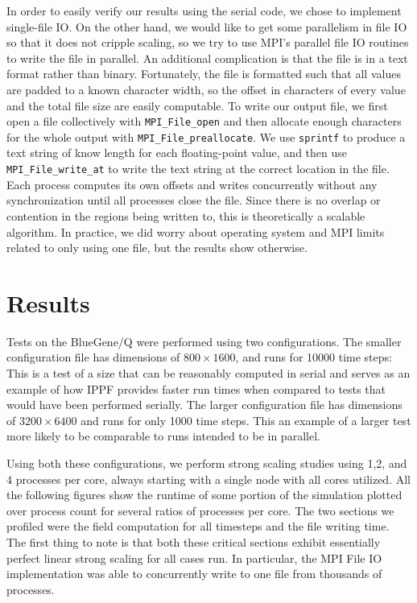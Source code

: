\documentclass[twocolumn]{article}
\begin{document}
In order to easily verify our results using the serial code,
we chose to implement single-file IO.
On the other hand, we would like to get some parallelism in
file IO so that it does not cripple scaling, so we try to use
MPI's parallel file IO routines to write the file in parallel.
An additional complication is that the file is in a text format
rather than binary.
Fortunately, the file is formatted such that all values are
padded to a known character width, so the offset in characters
of every value and the total file size are easily computable.
To write our output file, we first open a file collectively
with \texttt{MPI\_File\_open} and then 
allocate enough characters for the whole output with
\texttt{MPI\_File\_preallocate}.
We use
\texttt{sprintf} to produce a text string of know length for
each floating-point value, and then use
\texttt{MPI\_File\_write\_at} to write the text string at
the correct location in the file.
Each process computes its own offsets and writes concurrently
without any synchronization until all processes close the file.
Since there is no overlap or contention in the regions being
written to,
this is theoretically a scalable algorithm.
In practice, we did worry about
operating system and MPI limits related to only using one file,
but the results show otherwise.

\section{Results}

Tests on the BlueGene/Q were performed using two configurations.
The smaller configuration file has dimensions of $800\times 1600$,
and runs for 10000 time steps:\\

This is a test of a size that can be reasonably computed in serial
and serves as an example of how IPPF provides faster run times when
compared to tests that would have been performed serially.
The larger configuration file has dimensions of $3200\times 6400$
and runs for only 1000 time steps. This an example of a larger
test more likely to be comparable to runs intended to be in parallel.


Using both these configurations, we perform strong scaling studies
using 1,2, and 4 processes per core, always starting with
a single node with all cores utilized.
All the following figures show the runtime of some portion
of the simulation plotted over process count for several ratios
of processes per core.
The two sections we profiled were the field computation for all
timesteps and the file writing time.
The first thing to note is that both these critical sections exhibit
essentially perfect linear strong scaling for all cases run.
In particular, the MPI File IO implementation was able to concurrently
write to one file from thousands of processes.
\end{document}
